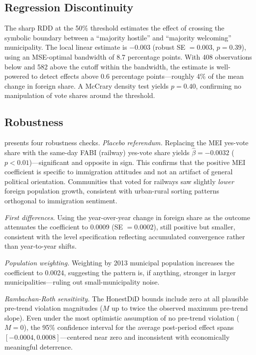 \documentclass[12pt]{article}
\begin{document}


\subsection{Regression Discontinuity}

The sharp RDD at the 50\% threshold estimates the effect of crossing the symbolic boundary between a ``majority hostile'' and ``majority welcoming'' municipality. The local linear estimate is $-0.003$ (robust SE $= 0.003$, $p = 0.39$), using an MSE-optimal bandwidth of 8.7 percentage points. With 408 observations below and 582 above the cutoff within the bandwidth, the estimate is well-powered to detect effects above 0.6 percentage points---roughly 4\% of the mean change in foreign share. A McCrary density test yields $p = 0.40$, confirming no manipulation of vote shares around the threshold.

\subsection{Robustness}

 presents four robustness checks. \textit{Placebo referendum.} Replacing the MEI yes-vote share with the same-day FABI (railway) yes-vote share yields $\hat{\beta} = -0.0032$ ($p < 0.01$)---significant and opposite in sign. This confirms that the positive MEI coefficient is specific to immigration attitudes and not an artifact of general political orientation. Communities that voted for railways saw slightly \textit{lower} foreign population growth, consistent with urban-rural sorting patterns orthogonal to immigration sentiment.

\textit{First differences.} Using the year-over-year change in foreign share as the outcome attenuates the coefficient to 0.0009 (SE $= 0.0002$), still positive but smaller, consistent with the level specification reflecting accumulated convergence rather than year-to-year shifts.

\textit{Population weighting.} Weighting by 2013 municipal population increases the coefficient to 0.0024, suggesting the pattern is, if anything, stronger in larger municipalities---ruling out small-municipality noise.

\textit{Rambachan-Roth sensitivity.} The HonestDiD bounds include zero at all plausible pre-trend violation magnitudes ($M$ up to twice the observed maximum pre-trend slope). Even under the most optimistic assumption of no pre-trend violation ($M = 0$), the 95\% confidence interval for the average post-period effect spans $[-0.0004, 0.0008]$---centered near zero and inconsistent with economically meaningful deterrence.
\end{document}
